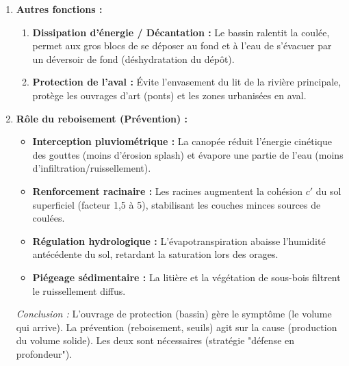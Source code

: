 \documentclass[11pt]{article}
\begin{document}
\begin{exoresolu}
\begin{enumerate}
            $V_{conception} = S \times H \Rightarrow H = \frac{V_{conception}}{S} = \frac{30\,000}{800} = 37,5 \text{ m}$.
            \textit{Remarque :} Une hauteur de 37,5 m est considérable pour un bassin de fond de vallée. En pratique, on augmenterait la surface $S$ (élargir le bassin) ou on accepterait un débordement contrôlé par un déversoir pour des événements plus rares, ou on combinerait avec des seuils en amont pour réduire $V_s$.
        \item \textbf{Autres fonctions :}
            \begin{enumerate}
                \item \textbf{Dissipation d'énergie / Décantation :} Le bassin ralentit la coulée, permet aux gros blocs de se déposer au fond et à l'eau de s'évacuer par un déversoir de fond (déshydratation du dépôt).
                \item \textbf{Protection de l'aval :} Évite l'envasement du lit de la rivière principale, protège les ouvrages d'art (ponts) et les zones urbanisées en aval.
            \end{enumerate}
        \item \textbf{Rôle du reboisement (Prévention) :}
            \begin{itemize}
                \item \textbf{Interception pluviométrique :} La canopée réduit l'énergie cinétique des gouttes (moins d'érosion splash) et évapore une partie de l'eau (moins d'infiltration/ruissellement).
                \item \textbf{Renforcement racinaire :} Les racines augmentent la cohésion $c'$ du sol superficiel (facteur 1,5 à 5), stabilisant les couches minces sources de coulées.
                \item \textbf{Régulation hydrologique :} L'évapotranspiration abaisse l'humidité antécédente du sol, retardant la saturation lors des orages.
                \item \textbf{Piégeage sédimentaire :} La litière et la végétation de sous-bois filtrent le ruissellement diffus.
            \end{itemize}
            \textit{Conclusion :} L'ouvrage de protection (bassin) gère le symptôme (le volume qui arrive). La prévention (reboisement, seuils) agit sur la cause (production du volume solide). Les deux sont nécessaires (stratégie "défense en profondeur").
    \end{enumerate}
\end{exoresolu}
\end{document}
